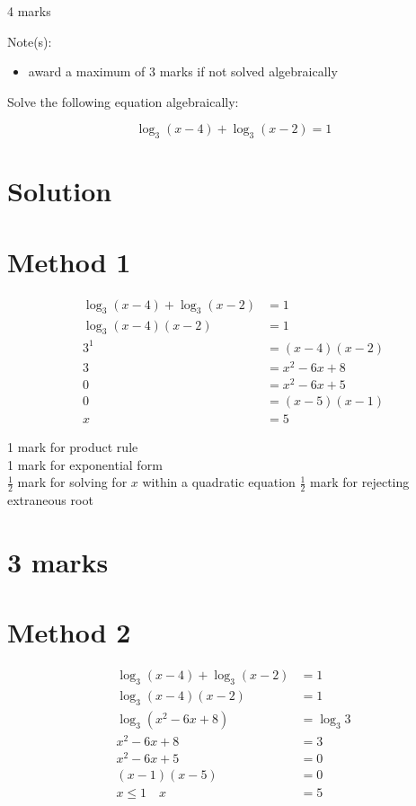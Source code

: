 \documentclass[10pt]{article}
\begin{document}
4 marks

Note(s):

\begin{itemize}
  \item award a maximum of 3 marks if not solved algebraically
\end{itemize}

Solve the following equation algebraically:

$$
\log _{3}(x-4)+\log _{3}(x-2)=1
$$

\section*{Solution}
\section*{Method 1}
$$
\begin{aligned}
\log _{3}(x-4)+\log _{3}(x-2) & =1 \\
\log _{3}(x-4)(x-2) & =1 \\
3^{1} & =(x-4)(x-2) \\
3 & =x^{2}-6 x+8 \\
0 & =x^{2}-6 x+5 \\
0 & =(x-5)(x-1) \\
x & =5
\end{aligned}
$$

1 mark for product rule\\
1 mark for exponential form\\
$\frac{1}{2}$ mark for solving for $x$ within a quadratic equation $\frac{1}{2}$ mark for rejecting extraneous root

\section*{3 marks}
\section*{Method 2}
$$
\begin{aligned}
\log _{3}(x-4)+\log _{3}(x-2) & =1 \\
\log _{3}(x-4)(x-2) & =1 \\
\log _{3}\left(x^{2}-6 x+8\right) & =\log _{3} 3 \\
x^{2}-6 x+8 & =3 \\
x^{2}-6 x+5 & =0 \\
(x-1)(x-5) & =0 \\
x \leq 1 \quad x & =5
\end{aligned}
$$
\end{document}
